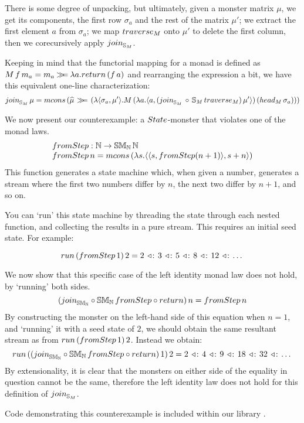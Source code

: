 There is some degree of unpacking, but ultimately, given a monster matrix $\mu$, we get its components, the first row $\sigma_a$ and the rest of the matrix $\mu'$; 
we extract the first element $a$ from $\sigma_a$;
we map $\traverse_M$ onto $\mu'$ to delete the first column, then we corecursively apply $\join_{\stream{M}}$.

Keeping in mind that the functorial mapping for a monad is defined as $M\,f\,m_a = m_a \bind \lambda a. \return\,(f\,a)$ and rearranging the expression a bit, we have this equivalent one-line characterization:
$$
\join_{\stream{M}}\, \mu = \mcons\, (\unc{\mu} \, \bind \,(\lambda \pair{\sigma_a}{\mu'} . M\,(\lambda a . \pair{a}{(\join_{\stream{M}}\, \comp\, \stream{M}\,\traverse_M)\, \mu'})\, (\head_M\, \sigma_a)))
$$

We now present our counterexample: a $\state$-monster that violates one of the monad laws.
$$
\begin{array}{l}
\fromstepstr : \nat \rightarrow \stmon{\nat}\,\nat \\
\fromstepstr\, n = \mcons\, (\lambda s. \pair{\pair{s}{\fromstepstr (n + 1)}}{s + n})
\end{array}
$$
This function generates a state machine which, when given a number, generates a stream where the first two numbers differ by $n$, the next two differ by $n + 1$, and so on.

You can `run' this state machine by threading the state through each nested function, and collecting the results in a pure stream. This requires an initial seed state. For example:

$$
\strun\,(\fromstepstr\, 1)\, 2 = 2\, \acons\, 3\, \acons\, 5\, \acons\, 8\, \acons\, 12\, \acons\, \dots
$$

We now show that this specific case of the left identity monad law does not hold, by `running' both sides.
$$
(\join_{\stmon{\nat}} \comp \stmon{\nat}\, \fromstepstr \comp \return)\, n = \fromstepstr\, n
$$
By constructing the monster on the left-hand side of this equation when $n = 1$, and `running' it with a seed state of $2$, we should obtain the same resultant stream as from $\strun\,(\fromstepstr\, 1)\, 2$. Instead we obtain:
$$
\strun\, ((\join_{\stmon{\nat}} \comp \stmon{\nat}\, \fromstepstr \comp \return)\, 1)\, 2 = 2\, \acons\, 4\, \acons\, 9\, \acons\, 18\, \acons\, 32\, \acons\, \dots
$$
By extensionality, it is clear that the monsters on either side of the equality in question cannot be the same, therefore the left identity law does not hold for this definition of $\join_{\stream{M}}$.

Code demonstrating this counterexample is included within our library . 




